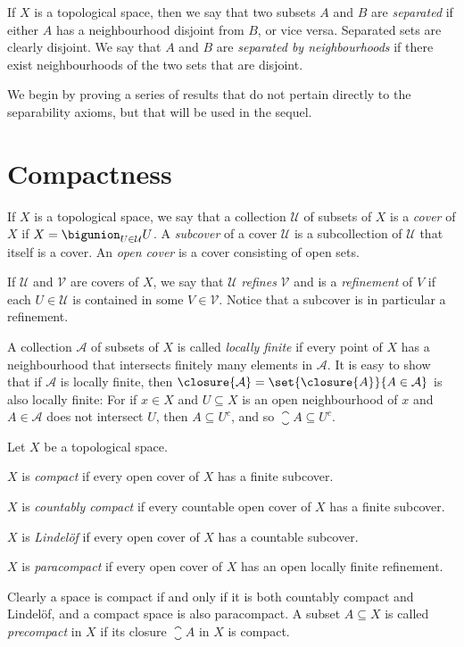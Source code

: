 \documentclass[article, a4paper, 11pt, oneside]{memoir}
\numberwithin{equation}{chapter}
\newcommand{\calU}{\mathcal{U}}
\newcommand{\calV}{\mathcal{V}}
\begin{document}
If $X$ is a topological space, then we say that two subsets $A$ and $B$ are \emph{separated} if either $A$ has a neighbourhood disjoint from $B$, or vice versa. Separated sets are clearly disjoint. We say that $A$ and $B$ are \emph{separated by neighbourhoods} if there exist neighbourhoods of the two sets that are disjoint.

We begin by proving a series of results that do not pertain directly to the separability axioms, but that will be used in the sequel.


\section{Compactness}

\newcommand{\calA}{\mathcal{A}}

If $X$ is a topological space, we say that a collection $\calU$ of subsets of $X$ is a \emph{cover} of $X$ if $X = \bigunion_{U \in \calU} U$. A \emph{subcover} of a cover $\calU$ is a subcollection of $\calU$ that itself is a cover. An \emph{open cover} is a cover consisting of open sets.

If $\calU$ and $\calV$ are covers of $X$, we say that $\calU$ \emph{refines} $\calV$ and is a \emph{refinement} of $V$ if each $U \in \calU$ is contained in some $V \in \calV$. Notice that a subcover is in particular a refinement.

A collection $\calA$ of subsets of $X$ is called \emph{locally finite} if every point of $X$ has a neighbourhood that intersects finitely many elements in $\calA$. It is easy to show that if $\calA$ is locally finite, then $\closure{\calA} = \set{\closure{A}}{A \in \calA}$ is also locally finite: For if $x \in X$ and $U \subseteq X$ is an open neighbourhood of $x$ and $A \in \calA$ does not intersect $U$, then $A \subseteq U^c$, and so $\closure{A} \subseteq U^c$.

\begin{definition}
    Let $X$ be a topological space.
    \begin{enumdef}
        \item $X$ is \emph{compact} if every open cover of $X$ has a finite subcover.
        
        \item $X$ is \emph{countably compact} if every countable open cover of $X$ has a finite subcover.

        \item $X$ is \emph{Lindelöf} if every open cover of $X$ has a countable subcover.

        \item $X$ is \emph{paracompact} if every open cover of $X$ has an open locally finite refinement.
    \end{enumdef}
\end{definition}
%
Clearly a space is compact if and only if it is both countably compact and Lindelöf, and a compact space is also paracompact. A subset $A \subseteq X$ is called \emph{precompact} in $X$ if its closure $\closure{A}$ in $X$ is compact.
\end{document}

